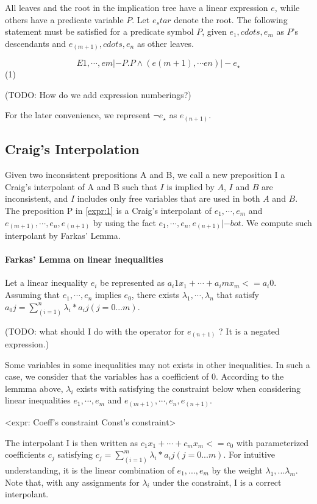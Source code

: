 \documentclass{llncs}
\begin{document}
All leaves and the root in the implication tree have a linear expression $e$, while others have a predicate variable $P$. Let $e_star$ denote the root. The following statement must be satisfied for a predicate symbol $P$, given $e_1,cdots,e_m$ as $P$'s descendants and $e_(m+1),cdots,e_n$ as other leaves.

$$E1,\cdots,em |- P. P \wedge (e(m+1), \cdots en) |- e_\star$$    	(1)

(TODO: How do we add expression numberings?)

For the later convenience, we represent $\neg e_\star$ as $e_(n+1)$.


\subsection{Craig's Interpolation}

Given two inconsistent prepositions A and B, we call a new preposition I a Craig's interpolant of A and B such that $I$ is implied by $A$, $I$ and $B$ are inconsistent, and $I$ includes only free variables that are used in both $A$ and $B$. The preposition P in \ref{expr:1} is a Craig's interpolant of $e_1,\cdots,e_m$ and $e_(m+1),\cdots,e_n,e_(n+1)$ by using the fact $e_1,\cdots,e_n,e_(n+1) |- bot$. We compute such interpolant by Farkas' Lemma.

\paragraph{Farkas' Lemma on linear inequalities} Let a linear inequality $e_i$ be represented as $a_i1 x_1 + \cdots + a_im x_m <= a_i0$. Assuming that $e_1,\cdots,e_n$ implies $e_0$, there exists $\lambda_1,\cdots,\lambda_n$ that satisfy $a_0j =\sum_(i=1)^n \lambda_i * a_ij (j=0...m)$.

(TODO: what should I do with the operator for $e_(n+1)$ ? It is a negated expression.)

Some variables in some inequalities may not exists in other inequalities. In such a case, we consider that the variables has a coefficient of $0$. According to the lemmma above, $\lambda_i$ exists with satisfying the constraint below when considering linear inequalities $e_1,\cdots,e_m$ and $e_(m+1),\cdots,e_n,e_(n+1)$.

<expr: Coeff's constraint
Const's constraint>

The interpolant I is then written as $c_1 x_1 + \cdots + c_m x_m <= c_0$ with parameterized coefficients $c_j$ satisfying $c_j =\sum_(i=1)^m \lambda _i * a_ij (j=0...m)$. For intuitive understanding, it is the linear combination of $e_1,...,e_m$ by the weight $\lambda _1,...\lambda _m$. Note that, with any assignments for $\lambda _i$ under the constraint, I is a correct interpolant.
\end{document}

